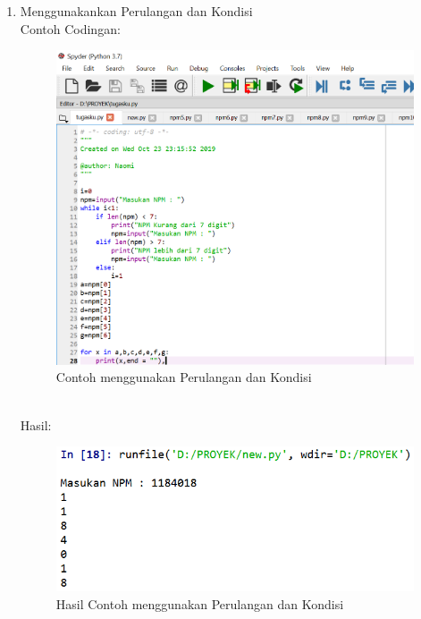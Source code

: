 \begin{enumerate}
    \newpage
    \item Menggunakankan Perulangan dan Kondisi\\
    Contoh Codingan:
    \begin{figure}[!htbp]
    \centering
    \includegraphics[width=13cm]{gambar2/perulangan.png}
    \caption{Contoh menggunakan Perulangan dan Kondisi}
    \end{figure}\\
    Hasil:
    \begin{figure}[!htbp]
    \centering
    \includegraphics[width=14cm]{gambar2/perulangan1.png}
    \caption{Hasil Contoh menggunakan Perulangan dan Kondisi}
    \end{figure}
    

\end{enumerate}
